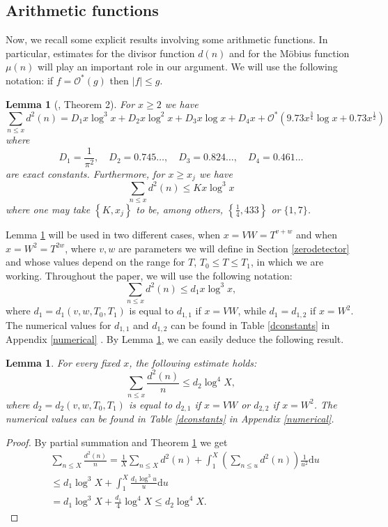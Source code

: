 \documentclass[reqno]{amsart}
\newtheorem{lemma}[theorem]{Lemma}
\numberwithin{equation}{section}
\theoremstyle{remark}
\begin{document}
\subsection{Arithmetic functions}Now, we recall some explicit results involving some arithmetic functions. In particular, estimates for the divisor function $d(n)$ and for the Möbius function $\mu(n)$ will play an important role in our argument. We will use the following notation: if $f=\mathcal{O}^*(g)$ then $|f|\le g$.
\begin{lemma}[\cite{CullyHugill2019TwoED}, Theorem 2]\label{michaela-tim}
For $x \geq 2$ we have
$$
\sum_{n \leq x} d^2(n)=D_1 x \log ^3 x+D_2 x \log ^2 x+D_3 x \log x+D_4 x+\mathcal{O}^*\left(9.73 x^{\frac{3}{4}} \log x+0.73 x^{\frac{1}{2}}\right)
$$
where
$$
D_1=\frac{1}{\pi^2}, \quad D_2=0.745 \ldots, \quad D_3=0.824 \ldots, \quad D_4=0.461 \ldots
$$
are exact constants. Furthermore, for $x \geq x_j$ we have
$$
\sum_{n \leq x} d^2(n) \leq K x \log ^3 x
$$
where one may take $\left\{K, x_j\right\}$ to be, among others, $\left\{\frac{1}{4}, 433\right\}$ or $\{1,7\}$.
\end{lemma}
Lemma \ref{michaela-tim} will be used in two different cases, when $x=VW=T^{v+w}$ and when $x=W^2=T^{2w}$, where $v,w$ are parameters we will define in Section \ref{zerodetector} and whose values depend on the range for $T$, $T_0\le T\le T_1$, in which we are working. Throughout the paper, we will use the following notation:
\begin{equation*}
    \sum_{n \leq x} d^2(n) \leq d_1 x \log ^3 x,
\end{equation*}
where $d_1=d_1(v,w,T_0,T_1)$ is equal to $d_{1,1}$ if $x=VW$, while $d_1=d_{1,2}$ if $x=W^2$. The numerical values for $d_{1,1}$ and $d_{1,2}$ can be found in Table \ref{dconstants} in Appendix \ref{numerical} .
By Lemma \ref{michaela-tim}, we can easily deduce the following result.
\begin{lemma}\label{d2overn}
    For every fixed $x$, the following estimate holds:
    \[
    \sum_{n\le x}\frac{d^2(n)}{n}\le d_2\log^4X,
    \]
    where $d_2=d_2(v,w,T_0,T_1)$ is equal to $d_{2,1}$ if $x=VW$ or $d_{2,2}$ if $x=W^2$. The numerical values can be found in Table \ref{dconstants} in Appendix \ref{numerical}. 
\end{lemma}
\begin{proof}
By partial summation and Theorem \ref{michaela-tim} we get
    \begin{equation*}
        \begin{aligned}
            &\sum_{n\le X}\frac{d^2(n)}{n}=\frac{1}{X}\sum_{n\le X}d^2(n)+\int_1^X\left(\sum_{n\le u}d^2(n)\right)\frac{1}{u^{2}}\text{d}u\\&\le d_1\log^3X+\int_1^X\frac{d_1\log^3u}{u}\text{d}u\\&= d_1\log^3X+\frac{d_1}{4}\log^4X\le d_2\log^4X.
        \end{aligned}
    \end{equation*}
\end{proof}
\end{document}
